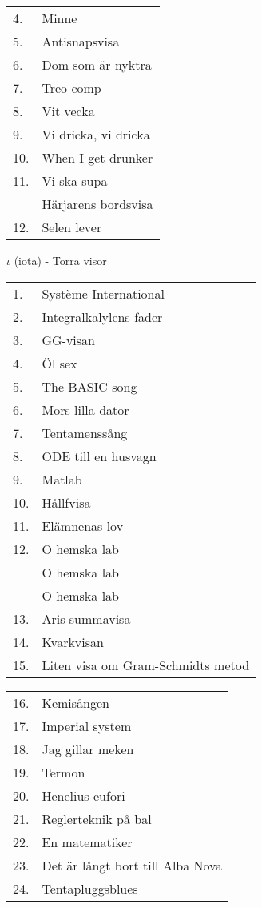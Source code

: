 \documentclass[a6paper,10pt]{article}
\begin{document}
\begin{table}[!h]
\begin{tabularx}{1\textwidth}{l X}
4.&Minne\\
5.&Antisnapsvisa\\
6.&Dom som är nyktra\\
7.&Treo-comp\\
8.&Vit vecka\\
9.&Vi dricka, vi dricka\\
10.&When I get drunker\\
11.&Vi ska supa\\
&Härjarens bordsvisa\\
12.&Selen lever
\end{tabularx}
\end{table}
\vspace{5pt}
\noindent
\Large $\iota$ (iota) - Torra visor
\vspace{-5pt}
\begin{table}[!h]
\begin{tabularx}{1\textwidth}{l X}
1.&Système International\\
2.&Integralkalylens fader\\
3.&GG-visan\\
4.&Öl sex\\
5.&The BASIC song\\
6.&Mors lilla dator\\
7.&Tentamenssång\\
8.&ODE till en husvagn\\
9.&Matlab\\
10.&Hållfvisa\\
11.&Elämnenas lov\\
12.&O hemska lab\\
&O hemska lab\\
&O hemska lab\\
13.&Aris summavisa\\
14.&Kvarkvisan\\
15.&Liten visa om Gram-Schmidts metod\\
\end{tabularx}
\end{table}
\begin{table}[!h]
\begin{tabularx}{1\textwidth}{l X}
16.&Kemisången\\
17.&Imperial system\\
18.&Jag gillar meken\\
19.&Termon\\
20.&Henelius-eufori\\
21.&Reglerteknik på bal\\
22.&En matematiker\\
23.&Det är långt bort till Alba Nova\\
24.&Tentapluggsblues
\end{tabularx}
\end{table}
\end{document}
